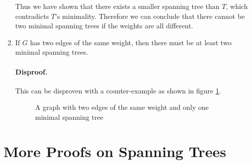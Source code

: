 \documentclass{article}
\begin{document}
\begin{enumerate}
		Thus we have shown that there exists a smaller spanning tree than \(T\), which contradicts \(T\)'s minimality. Therefore we can conclude that there cannot be two minimal spanning trees if the weights are all different.

	\item
		If \(G\) has two edges of the same weight, then there must be at least two minimal spanning trees.

		\paragraph{Disproof.} This can be disproven with a counter-example as shown in figure \ref{q4c-counter}.

		\begin{figure}[htbp]
			\centering
			\caption{A graph with two edges of the same weight and only one minimal spanning tree}
			\label{q4c-counter}
		\end{figure}
\end{enumerate}

\section{More Proofs on Spanning Trees}
\end{document}
